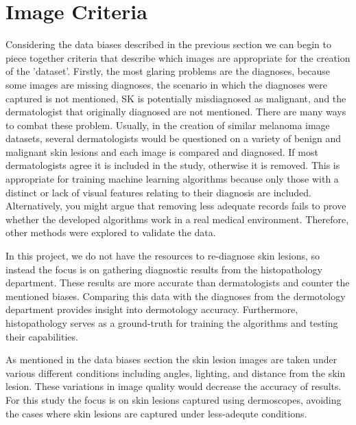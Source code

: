 \section{Image Criteria}
Considering the data biases described in the previous section we can begin to piece together criteria that describe which images are appropriate for the creation of the 'dataset'. Firstly, the most glaring problems are the diagnoses, because some images are missing diagnoses, the scenario in which the diagnoses were captured is not mentioned, SK is potentially misdiagnosed as malignant, and the dermatologist that originally diagnosed are not mentioned. There are many ways to combat these problem. Usually, in the creation of similar melanoma image datasets, several dermatologists would be questioned on a variety of benign and malignant skin lesions and each image is compared and diagnosed. If most dermatologists agree it is included in the study, otherwise it is removed\cite{}. This is appropriate for training machine learning algorithms because only those with a distinct or lack of visual features relating to their diagnosis are included. Alternatively, you might argue that removing less adequate records fails to prove whether the developed algorithms work in a real medical environment. Therefore, other methods were explored to validate the data.

In this project, we do not have the resources to re-diagnose skin lesions, so instead the focus is on gathering diagnostic results from the histopathology department. These results are more accurate than dermatologists\cite{} and counter the mentioned biases. Comparing this data with the diagnoses from the dermotology department provides insight into dermotology accuracy. Furthermore, histopathology serves as a ground-truth for training the algorithms and testing their capabilities.

As mentioned in the data biases section the skin lesion images are taken under various different conditions including angles, lighting, and distance from the skin lesion. These variations in image quality would decrease the accuracy of results. For this study the focus is on skin lesions captured using dermoscopes, avoiding the cases where skin lesions are captured under less-adequte conditions.
